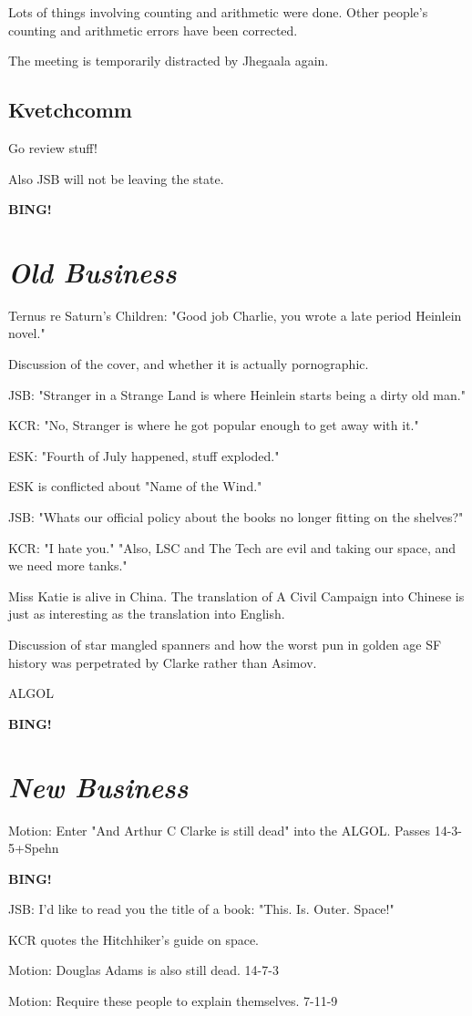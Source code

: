 \documentclass[10pt]{article}
\newcommand{\bing}{{\bf BING!} }
\newcommand{\goto}[1]{\bing \vskip 12pt \section*{{\em{#1}}}}
\begin{document}
Lots of things involving counting and arithmetic were done.  Other people's
counting and arithmetic errors have been corrected.

The meeting is temporarily distracted by Jhegaala again.

\subsection*{Kvetchcomm}

Go review stuff!

Also JSB will not be leaving the state.

\goto{Old Business}

Ternus re Saturn's Children:  "Good job Charlie, you wrote a late period Heinlein novel."

Discussion of the cover, and whether it is actually pornographic.

JSB:  "Stranger in a Strange Land is where Heinlein starts being a dirty old man."

KCR:  "No, Stranger is where he got popular enough to get away with it."

ESK:  "Fourth of July happened, stuff exploded."

ESK is conflicted about "Name of the Wind."

JSB:  "Whats our official policy about the books no longer fitting on the shelves?"

KCR:  "I hate you."  "Also, LSC and The Tech are evil and taking our space, and we need more tanks."

Miss Katie is alive in China.  The translation of A Civil Campaign into Chinese is just as interesting
as the translation into English.

Discussion of star mangled spanners and how the worst pun in golden age SF history was perpetrated by Clarke
rather than Asimov.

ALGOL

\goto{New Business}

Motion:  Enter "And Arthur C Clarke is still dead" into the ALGOL.  Passes 14-3-5+Spehn

\bing

JSB:  I'd like to read you the title of a book:  "This.  Is.  Outer.  Space!"

KCR quotes the Hitchhiker's guide on space.

Motion:  Douglas Adams is also still dead.  14-7-3

Motion:  Require these people to explain themselves.  7-11-9
\end{document}
